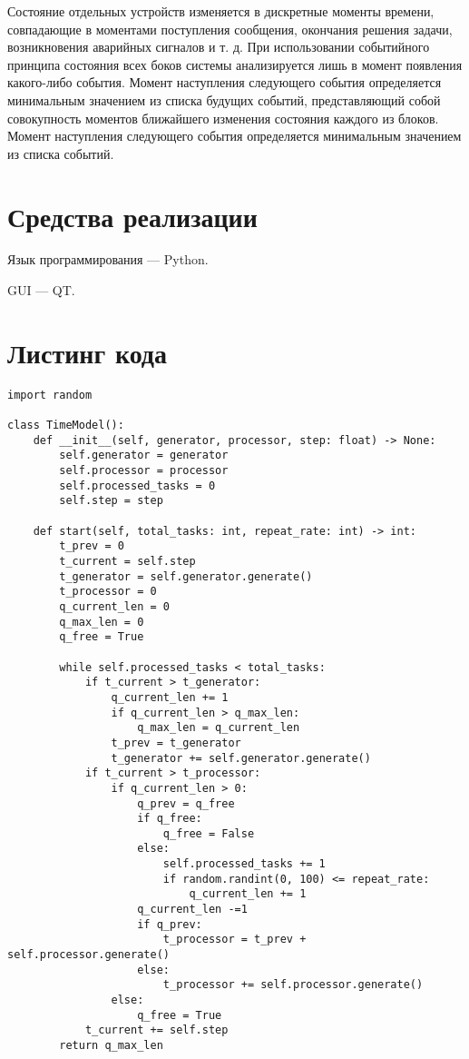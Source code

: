 Состояние отдельных устройств изменяется в дискретные моменты времени, совпадающие в моментами поступления сообщения, окончания решения задачи, возникновения аварийных сигналов и т. д. При использовании событийного принципа состояния всех боков системы анализируется лишь в момент появления какого-либо события. Момент наступления следующего события определяется минимальным значением из списка будущих событий, представляющий собой совокупность моментов ближайшего изменения состояния каждого из блоков. Момент наступления следующего события определяется минимальным значением из списка событий.


\section*{Средства реализации}

Язык программирования --- Python.

GUI --- QT.

\clearpage

\section*{Листинг кода}

\begin{lstlisting}
import random

class TimeModel():
	def __init__(self, generator, processor, step: float) -> None:
		self.generator = generator
		self.processor = processor
		self.processed_tasks = 0
		self.step = step

	def start(self, total_tasks: int, repeat_rate: int) -> int:
		t_prev = 0
		t_current = self.step
		t_generator = self.generator.generate()
		t_processor = 0
		q_current_len = 0
		q_max_len = 0
		q_free = True

		while self.processed_tasks < total_tasks:
			if t_current > t_generator:
				q_current_len += 1
				if q_current_len > q_max_len:
					q_max_len = q_current_len
				t_prev = t_generator
				t_generator += self.generator.generate()
			if t_current > t_processor:
				if q_current_len > 0:
					q_prev = q_free
					if q_free:
						q_free = False
					else:
						self.processed_tasks += 1
						if random.randint(0, 100) <= repeat_rate:
							q_current_len += 1
					q_current_len -=1
					if q_prev:
						t_processor = t_prev + self.processor.generate()
					else:
						t_processor += self.processor.generate()
				else:
					q_free = True
			t_current += self.step
		return q_max_len
\end{lstlisting}


